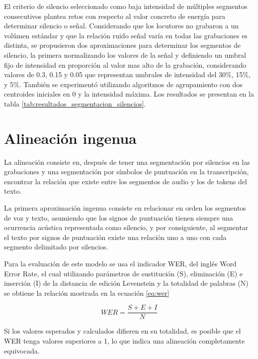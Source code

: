 El criterio de silencio seleccionado como baja intensidad de múltiples segmentos consecutivos plantea retos con respecto al valor concreto de energía para determinar silencio o señal. Considerando que los locutores no grabaron a un volúmen estándar y que la relación ruido señal varía en todas las grabaciones es distinta, se propusieron dos aproximaciones para determinar los segmentos de silencio, la primera normalizando los valores de la señal y definiendo un umbral fijo de intensidad en proporción al valor mas alto de la grabación, considerando valores de 0.3, 0.15 y 0.05 que representan umbrales de intensidad del 30\%, 15\%, y 5\%. También se experimentó utilizando algoritmos de agrupamiento con dos centroides iniciales en 0 y la intensidad máxima. Los resultados se presentan en la tabla \ref{tab:resultados_segmentacion_silencios}.




\section{Alineación ingenua}

La alineación consiste en, después de tener una segmentación por silencios en las grabaciones y una segmentación por símbolos de puntuación en la transcripción, encontrar la relación que existe entre los segmentos de audio y los de tokens del texto.

La primera aproximación ingenua consiste en relacionar en orden los segmentos de voz y texto, asumiendo que los signos de puntuación tienen siempre una ocurrencia acústica representada como silencio, y por consiguiente, al segmentar el texto por signos de puntuación existe una relación uno a uno con cada segmento delimitado por silencios.

Para la evaluación de este modelo se usa el indicador WER, del inglés Word Error Rate, el cual utilizando parámetros de sustitución (S), eliminación (E) e inserción (I) de la distancia de edición Levenstein \cite{Levenshtein_SPD66} y la totalidad de palabras (N) se obtiene la relación mostrada en la ecuación \ref{eq:wer}

\begin{equation}
    \label{eq:wer}
    WER = \frac{S + E + I}{N}
\end{equation}

Si los valores esperados y calculados difieren en su totalidad, es posible que el WER tenga valores superiores a 1, lo que indica una alineación completamente equivocada.

